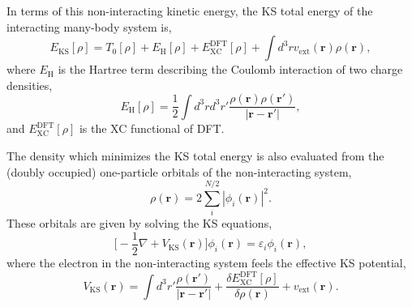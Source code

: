 \documentclass[12pt,a4paper,twoside]{article}
\numberwithin{equation}{section}
\renewcommand{\_}{\textscale{.7}{\textunderscore}}
\begin{document}
In terms of this non-interacting kinetic energy, the KS total energy of the interacting many-body system is,
\begin{equation}\label{KS:total-energy-functional}
    E_{\textrm{KS}}[\rho] = T_0[\rho] + E_{\textrm{H}}[\rho] + E_{\textrm{XC}}^{\textrm{DFT}}[\rho] + \int d^3r v_{\textrm{ext}}(\textbf{r}) \rho(\textbf{r}),
\end{equation}
where $E_{\textrm{H}}$ is the Hartree term describing the Coulomb interaction of two charge densities,
\begin{equation}\label{eq:Hartree-energy}
    E_{\textrm{H}}[\rho] = \frac{1}{2}\int d^3r d^3r' \frac{\rho(\textbf{r}) \rho(\textbf{r}')}{|\textbf{r}-\textbf{r}'|},
\end{equation}
and $E_{\textrm{XC}}^{\textrm{DFT}}[\rho]$ is the XC functional of DFT.

The density which minimizes the KS total energy is also evaluated from the (doubly occupied) one-particle orbitals of the non-interacting system, 
\begin{equation}
    \rho(\textbf{r}) = 2\sum_{i}^{N/2} |\phi_i(\textbf{r})|^2. 
\end{equation}
These orbitals are given by solving the KS equations,
\begin{equation}\label{eq:Kohn-Sham-equations}
    \bigg[-\frac{1}{2}\nabla + V_{\textrm{KS}}(\textbf{r})\bigg] \phi_i(\textbf{r}) = \varepsilon_i\phi_i(\textbf{r}),
\end{equation}
where the electron in the non-interacting system feels the effective KS potential,
\begin{equation}\label{eq:Kohn-sham-potential}
    V_{\textrm{KS}}(\textbf{r}) =  \int d^3r' \frac{\rho(\textbf{r}')}{|\textbf{r}-\textbf{r}'|} + \frac{\delta E_{\textrm{XC}}^{\textrm{DFT}}[\rho]}{\delta\rho(\textbf{r})} + v_{\textrm{ext}}(\textbf{r}).
\end{equation}

\end{document}
